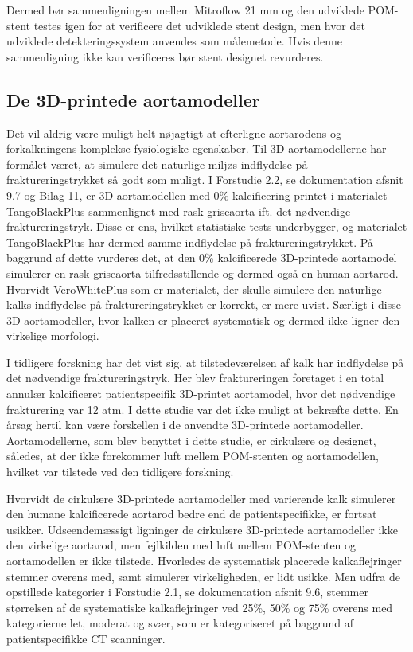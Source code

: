 Dermed bør sammenligningen mellem Mitroflow 21 mm og den udviklede POM-stent testes igen for at verificere det udviklede stent design, men hvor det udviklede detekteringssystem anvendes som målemetode. Hvis denne sammenligning ikke kan verificeres bør stent designet revurderes.    

\subsection*{De 3D-printede aortamodeller} 
Det vil aldrig være muligt helt nøjagtigt at efterligne aortarodens og forkalkningens komplekse fysiologiske egenskaber. Til 3D aortamodellerne har formålet været, at simulere det naturlige miljøs indflydelse på fraktureringstrykket så godt som muligt. I Forstudie 2.2, se dokumentation afsnit 9.7 og Bilag 11, er 3D aortamodellen med 0\% kalcificering printet i materialet TangoBlackPlus sammenlignet med rask griseaorta ift. det nødvendige fraktureringstryk. Disse er ens, hvilket statistiske tests underbygger, og materialet TangoBlackPlus har dermed samme indflydelse på fraktureringstrykket. På baggrund af dette vurderes det, at den 0\% kalcificerede 3D-printede aortamodel simulerer en rask griseaorta tilfredsstillende og dermed også en human aortarod. Hvorvidt VeroWhitePlus som er materialet, der skulle simulere den naturlige kalks indflydelse på fraktureringstrykket er korrekt, er mere uvist. Særligt i disse 3D aortamodeller, hvor kalken er placeret systematisk og dermed ikke ligner den virkelige morfologi. 

I tidligere forskning har det vist sig, at tilstedeværelsen af kalk har indflydelse på det nødvendige fraktureringstryk. Her blev fraktureringen foretaget i en total annulær kalcificeret patientspecifik 3D-printet aortamodel, hvor det nødvendige frakturering var 12 atm. I dette studie var det ikke muligt at bekræfte dette. En årsag hertil kan være forskellen i de anvendte 3D-printede aortamodeller. Aortamodellerne, som blev benyttet i dette studie, er cirkulære og designet, således, at der ikke forekommer luft mellem POM-stenten og aortamodellen, hvilket var tilstede ved den tidligere forskning.   

Hvorvidt de cirkulære 3D-printede aortamodeller med varierende kalk simulerer den humane kalcificerede aortarod bedre end de patientspecifikke, er fortsat usikker. Udseendemæssigt ligninger de cirkulære 3D-printede aortamodeller ikke den virkelige aortarod, men fejlkilden med luft mellem POM-stenten og aortamodellen er ikke tilstede. Hvorledes de systematisk placerede kalkaflejringer stemmer overens med, samt simulerer virkeligheden, er lidt usikke. Men udfra de opstillede kategorier i Forstudie 2.1, se dokumentation afsnit 9.6, stemmer størrelsen af de systematiske kalkaflejringer ved 25\%, 50\% og 75\% overens med kategorierne let, moderat og svær, som er kategoriseret på baggrund af patientspecifikke CT scanninger.   

